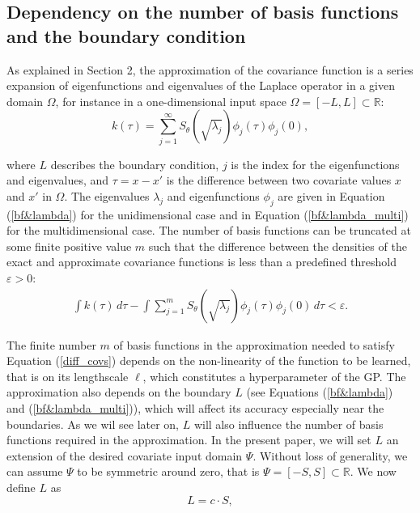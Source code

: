 \documentclass[]{interact}
\theoremstyle{plain}%
\theoremstyle{definition}
\theoremstyle{remark}
\begin{document}
\subsection{Dependency on the number of basis functions and the boundary condition}

As explained in Section 2, the approximation of the covariance function is a series expansion of eigenfunctions and eigenvalues of the Laplace operator in a given domain $\Omega$, for instance in a one-dimensional input space $\Omega=[-L,L]\subset \mathbb{R}$:
%
\begin{equation}\label{diffcov}
k(\tau) = \sum_{j=1}^{\infty} S_{\theta} \left(\sqrt{\lambda_j} \right) \phi_j(\tau) \phi_j(0),  \nonumber
\end{equation} 

\noindent where $L$ describes the boundary condition, $j$ is the index for the eigenfunctions and eigenvalues, and $\tau=x-x'$ is the difference between two covariate values $x$ and $x'$ in $\Omega$. The eigenvalues $\lambda_j$ and eigenfunctions $\phi_j$ are given in Equation (\ref{bf&lambda}) for the unidimensional case and in Equation (\ref{bf&lambda_multi}) for the multidimensional case. The number of basis functions can be truncated at some finite positive value $m$ such that the difference between the densities of the exact and approximate covariance functions is less than a predefined threshold $\varepsilon > 0$:
%
\begin{eqnarray}\label{diff_covs}
\int k(\tau) \, d\tau - 
\int \sum_{j=1}^m S_{\theta}\left(\sqrt{\lambda_j} \right) \phi_j(\tau) \phi_j(0) \, d\tau < \varepsilon.
\end{eqnarray}

The finite number $m$ of basis functions in the approximation needed to satisfy Equation (\ref{diff_covs}) depends on the non-linearity of the function to be learned, that is on its lengthscale $\ell$, which constitutes a hyperparameter of the GP. The approximation also depends on the boundary $L$ (see Equations (\ref{bf&lambda}) and (\ref{bf&lambda_multi})), which will affect its accuracy especially near the boundaries. As we wil see later on, $L$ will also influence the number of basis functions required in the approximation. In the present paper, we will set $L$ an extension of the desired covariate input domain $\Psi$. Without loss of generality, we can assume $\Psi$ to be symmetric around zero, that is $\Psi=[-S,S] \subset \mathbb{R}$. We now define $L$ as
%
\begin{equation}\label{eq:boundary}
L=c \cdot S,
\end{equation} 
\end{document}
